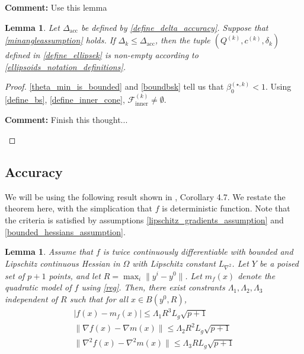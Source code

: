 \documentclass{article}
\newenvironment{comment}
  {\par\medskip
   \color{red}%
   \begin{framed}
   \textbf{Comment: }\ignorespaces}
 {\end{framed}
  \medskip}
\newtheorem{lemma}[theorem]{Lemma}
\theoremstyle{case}
\numberwithin{theorem}{subsection}
\newcommand{\bsk}{{\beta_0^{(\star, k)}}}
\newcommand{\ck}{{c^{(k)}}}
\newcommand{\dacc}{{\Delta_{\textrm{acc}}}}
\newcommand{\dk}{\Delta_k}
\newcommand{\fcki}{{\mathcal {F}^{(k)}_{\textrm{inner}}}}
\newcommand{\gradf}{\nabla f}
\newcommand{\liphess}{{L_{\nabla^2}}}
\newcommand{\qk}{{Q^{(k)}}}
\newcommand{\sdk}{{\delta_k}}
\begin{document}
\begin{comment}
Use this lemma
\end{comment}
\begin{lemma}
Let $\dacc$ be defined by \cref{define_delta_accuracy}.
Suppose that \cref{minangleassumption} holds.
If $\dk \le \dacc$, then the tuple $(\qk, \ck, \sdk)$ defined in \cref{define_ellipsek}
is non-empty according to \cref{ellipsoids_notation_definitions}.
\end{lemma}
\begin{proof}
\cref{theta_min_is_bounded} and \cref{boundbsk} tell us that $\bsk < 1$.
Using \cref{define_bs}, \cref{define_inner_cone},
$\fcki \ne \emptyset$.
\begin{comment}
Finish this thought...
\end{comment}
\end{proof}


\subsection{Accuracy}
\label{ellipsoidal_lambda}

We will be using the following result shown in \cite{BillupsLarson2013}, Corollary 4.7.
We restate the theorem here, with the simplication that $f$ is deterministic function.
Note that the criteria is satisfied by assumptions \cref{lipschitz_gradients_assumption} and \cref{bounded_hessians_assumption}.

\begin{lemma}
\label{change_radius} 
Assume that $f$ is twice continuously differentiable with bounded and Lipschitz continuous Hessian in $\Omega$ with Lipschitz constant $\liphess$.
Let $Y$ be a poised set of $p + 1$ points, and let $R = \max_{i}\|y^i - y^0\|$.
Let $m_f(x)$ denote the quadratic model of $f$ using \cref{reg}.
Then, there exist constrants $\Lambda_1, \Lambda_2, \Lambda_3$ independent of $R$ such that for all $x \in B(y^0, R)$,
\begin{align*}
|f(x) - m_f(x)| \le \Lambda_1 R^3L_g \sqrt{p+1} \\
\|\gradf(x) - \nabla m(x)\| \le \Lambda_2R^2  L_g \sqrt{p+1} \\
\|\nabla^2 f(x) - \nabla^2 m(x)\| \le \Lambda_3  RL_g \sqrt{p+1}
\end{align*}
\end{lemma}
\end{document}
